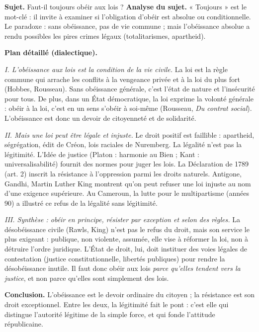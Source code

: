 \documentclass[11pt]{article}
\begin{document}
\begin{exoresolu}
\textbf{Sujet.} Faut-il toujours obéir aux lois ?
\tcblower
\textbf{Analyse du sujet.} « Toujours » est le mot-clé : il invite à examiner si l'obligation d'obéir est absolue ou conditionnelle. Le paradoxe : sans obéissance, pas de vie commune ; mais l'obéissance absolue a rendu possibles les pires crimes légaux (totalitarismes, apartheid).

\textbf{Plan détaillé (dialectique).}

\emph{I. L'obéissance aux lois est la condition de la vie civile.} La loi est la règle commune qui arrache les conflits à la vengeance privée et à la loi du plus fort (Hobbes, Rousseau). Sans obéissance générale, c'est l'état de nature et l'insécurité pour tous. De plus, dans un État démocratique, la loi exprime la volonté générale : obéir à la loi, c'est en un sens s'obéir à soi-même (Rousseau, \emph{Du contrat social}). L'obéissance est donc un devoir de citoyenneté et de solidarité.

\emph{II. Mais une loi peut être légale et injuste.} Le droit positif est faillible : apartheid, ségrégation, édit de Créon, lois raciales de Nuremberg. La légalité n'est pas la légitimité. L'Idée de justice (Platon : harmonie au Bien ; Kant : universalisabilité) fournit des normes pour juger les lois. La Déclaration de 1789 (art. 2) inscrit la résistance à l'oppression parmi les droits naturels. Antigone, Gandhi, Martin Luther King montrent qu'on peut refuser une loi injuste au nom d'une exigence supérieure. Au Cameroun, la lutte pour le multipartisme (années 90) a illustré ce refus de la légalité sans légitimité.

\emph{III. Synthèse : obéir en principe, résister par exception et selon des règles.} La désobéissance civile (Rawls, King) n'est pas le refus du droit, mais son service le plus exigeant : publique, non violente, assumée, elle vise à réformer la loi, non à détruire l'ordre juridique. L'État de droit, lui, doit instituer des voies légales de contestation (justice constitutionnelle, libertés publiques) pour rendre la désobéissance inutile. Il faut donc obéir aux lois \emph{parce qu'elles tendent vers la justice}, et non parce qu'elles sont simplement des lois.

\textbf{Conclusion.} L'obéissance est le devoir ordinaire du citoyen ; la résistance est son droit exceptionnel. Entre les deux, la légitimité fait le pont : c'est elle qui distingue l'autorité légitime de la simple force, et qui fonde l'attitude républicaine.
\end{exoresolu}
\end{document}

